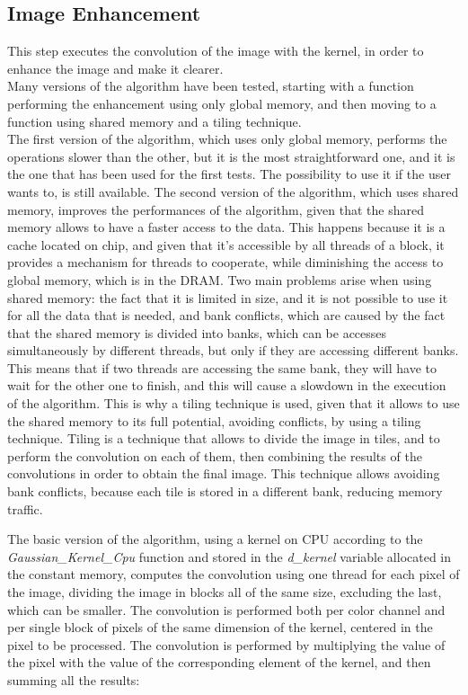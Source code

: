     \subsection{Image Enhancement}

    This step executes the convolution of the image with the kernel, in order to enhance the image and make it clearer.\\
    Many versions of the algorithm have been tested, starting with a function performing the enhancement using only global memory,
    and then moving to a function using shared memory and a tiling technique.\\
    The first version of the algorithm, which uses only global memory, performs the operations slower than the other,
    but it is the most straightforward one, and it is the one that has been used for the first tests. The possibility to use it if the user
    wants to, is still available. The second version of the algorithm, which uses shared memory, improves the performances of the algorithm, given that the shared memory
    allows to have a faster access to the data. This happens because it is a cache located on chip, and given that it's accessible by all threads of a block,
    it provides a mechanism for threads to cooperate, while diminishing the access to global memory, which is in the DRAM.
    Two main problems arise when using shared memory: the fact that it is limited in size, and it is not possible to use it for all the data that is needed, 
    and bank conflicts, which are caused by the fact that the shared memory is divided into banks, which can be accesses simultaneously by different threads,
    but only if they are accessing different banks. This means that if two threads are accessing the same bank, they will have to wait for the other one to finish,
    and this will cause a slowdown in the execution of the algorithm.
    This is why a tiling technique is used, given that it allows to use the shared memory to its full potential, avoiding conflicts, by using a tiling technique.
    Tiling is a technique that allows to divide the image in tiles, and to perform the convolution on each of them, then combining the results
    of the convolutions in order to obtain the final image. This technique allows avoiding bank conflicts, because each tile is stored in a different
    bank, reducing memory traffic.
    
    The basic version of the algorithm, using a kernel on CPU according to the \textit{Gaussian\_Kernel\_Cpu} function and stored in the \textit{d\_kernel} variable
    allocated in the constant memory, computes the convolution using one thread for each pixel of the image, dividing the image in blocks all of the same size, excluding the last, 
    which can be smaller. The convolution is performed both per color channel and per single block of pixels of the same dimension of the kernel, centered in the pixel to be processed.
    The convolution is performed by multiplying the value of the pixel with the value of the corresponding element of the kernel, and then summing all the results:

